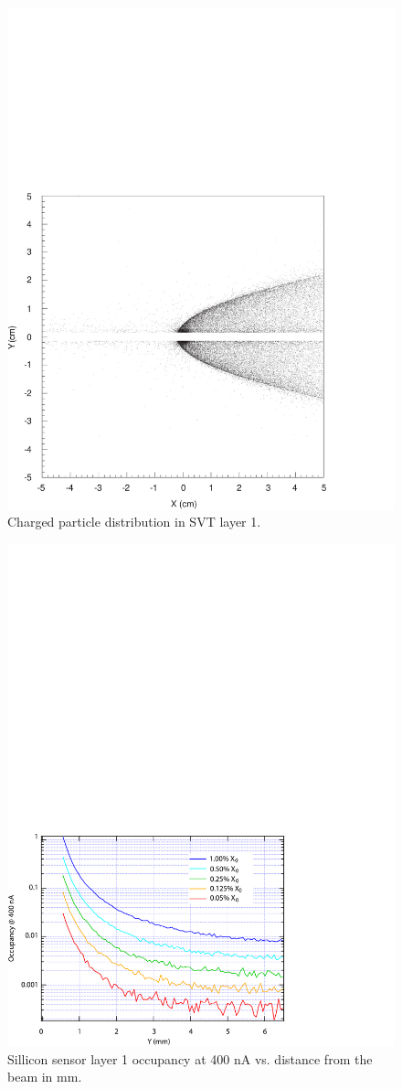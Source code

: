 \begin{figure}[h]
\includegraphics[width= 4 in]{performance/scatterplot.pdf}
\caption{\small{Charged particle distribution in SVT layer 1.}}
\label{fig:scatt}
\end{figure}

\begin{figure}[t]
\includegraphics[width=\textwidth]{performance/occupancy.pdf}
\caption{\small{Sillicon sensor layer 1 occupancy at 400 nA vs. distance from the
beam in mm.}}
\label{fig:occup}
\end{figure}

